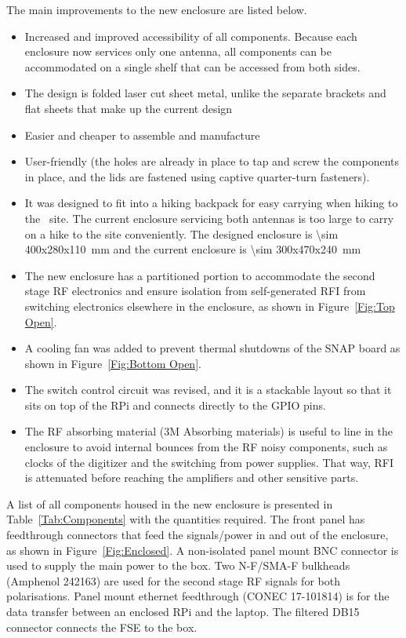 The main improvements to the new enclosure are listed below.

\begin{itemize}
	\item Increased and improved accessibility of all components. Because each enclosure now services only one antenna, all components can be accommodated on a single shelf that can be accessed from both sides.
	\item The design is folded laser cut sheet metal, unlike the separate brackets and flat sheets that make up the current design
	\item Easier and cheaper to assemble and manufacture
	\item User-friendly (the holes are already in place to tap and screw the components in place, and the lids are fastened using captive quarter-turn fasteners).
	\item It was designed to fit into a hiking backpack for easy carrying when hiking to the \prizm\ site. The current enclosure servicing both antennas is too large to carry on a hike to the site conveniently. The designed enclosure is \SI{\sim 400x280x110}{\milli \meter} and the current enclosure is \SI{\sim 300x470x240}{\milli \meter} 
	\item The new enclosure has a partitioned portion to accommodate the second stage RF electronics and ensure isolation from self-generated RFI from switching electronics elsewhere in the enclosure, as shown in Figure~\ref{Fig:Top Open}.
	\item A cooling fan was added to prevent thermal shutdowns of the SNAP board as shown in Figure~\ref{Fig:Bottom Open}.
	\item The switch control circuit was revised, and it is a stackable layout so that it sits on top of the RPi and connects directly to the GPIO pins.
	\item The RF absorbing material (3M Absorbing materials) is useful to line in the enclosure to avoid internal bounces from the RF noisy components, such as clocks of the digitizer and the switching from power supplies. That way, RFI is attenuated before reaching the amplifiers and other sensitive parts. 
\end{itemize}

A list of all components housed in the new enclosure is presented in Table~\ref{Tab:Components} with the quantities required. The front panel has feedthrough connectors that feed the signals/power in and out of the enclosure, as shown in Figure~\ref{Fig:Enclosed}. A non-isolated panel mount BNC connector is used to supply the main power to the box. Two N-F/SMA-F bulkheads (Amphenol 242163) are used for the second stage RF signals for both polarisations. Panel mount ethernet feedthrough (CONEC 17-101814) is for the data transfer between an enclosed RPi and the laptop. The filtered DB15 connector connects the FSE to the box.

